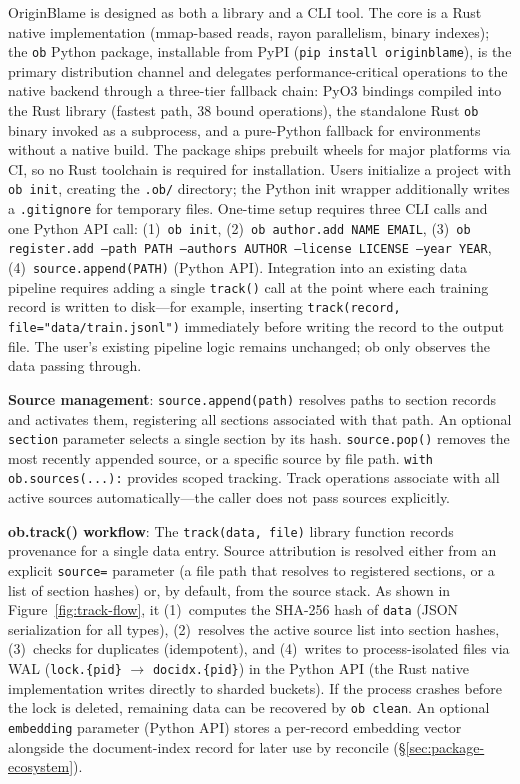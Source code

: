 OriginBlame is designed as both a library and a CLI tool. The core is a Rust native implementation (mmap-based reads, rayon parallelism, binary indexes); the \texttt{ob} Python package, installable from PyPI (\texttt{pip install originblame}), is the primary distribution channel and delegates performance-critical operations to the native backend through a three-tier fallback chain: PyO3 bindings compiled into the Rust library (fastest path, 38 bound operations), the standalone Rust \texttt{ob} binary invoked as a subprocess, and a pure-Python fallback for environments without a native build. The package ships prebuilt wheels for major platforms via CI, so no Rust toolchain is required for installation. Users initialize a project with \texttt{ob init}, creating the \texttt{.ob/} directory; the Python init wrapper additionally writes a \texttt{.gitignore} for temporary files. One-time setup requires three CLI calls and one Python API call: (1)~\texttt{ob init}, (2)~\texttt{ob author.add NAME EMAIL}, (3)~\texttt{ob register.add --path PATH --authors AUTHOR --license LICENSE --year YEAR}, (4)~\texttt{source.append(PATH)} (Python API). Integration into an existing data pipeline requires adding a single \texttt{track()} call at the point where each training record is written to disk---for example, inserting \texttt{track(record, file="data/train.jsonl")} immediately before writing the record to the output file. The user's existing pipeline logic remains unchanged; ob only observes the data passing through.

\textbf{Source management}: \texttt{source.append(path)} resolves paths to section records and activates them, registering all sections associated with that path. An optional \texttt{section} parameter selects a single section by its hash. \texttt{source.pop()} removes the most recently appended source, or a specific source by file path. \texttt{with ob.sources(...):} provides scoped tracking. Track operations associate with all active sources automatically---the caller does not pass sources explicitly.

\textbf{ob.track() workflow}: The \texttt{track(data, file)} library function records provenance for a single data entry. Source attribution is resolved either from an explicit \texttt{source=} parameter (a file path that resolves to registered sections, or a list of section hashes) or, by default, from the source stack. As shown in Figure~\ref{fig:track-flow}, it (1)~computes the SHA-256 hash of \texttt{data} (JSON serialization for all types), (2)~resolves the active source list into section hashes, (3)~checks for duplicates (idempotent), and (4)~writes to process-isolated files via WAL (\texttt{lock.\{pid\}} $\rightarrow$ \texttt{docidx.\{pid\}}) in the Python API (the Rust native implementation writes directly to sharded buckets). If the process crashes before the lock is deleted, remaining data can be recovered by \texttt{ob clean}. An optional \texttt{embedding} parameter (Python API) stores a per-record embedding vector alongside the document-index record for later use by reconcile (\S\ref{sec:package-ecosystem}).

